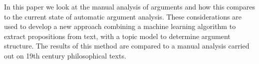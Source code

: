 In this paper we look at the manual analysis of arguments and how this compares to the current state of automatic argument analysis. These considerations are used to develop a new approach combining a machine learning algorithm to extract propositions from text, with a topic model to determine  argument structure.   The  results of this method are compared to a manual analysis carried out on 19th century philosophical texts.
